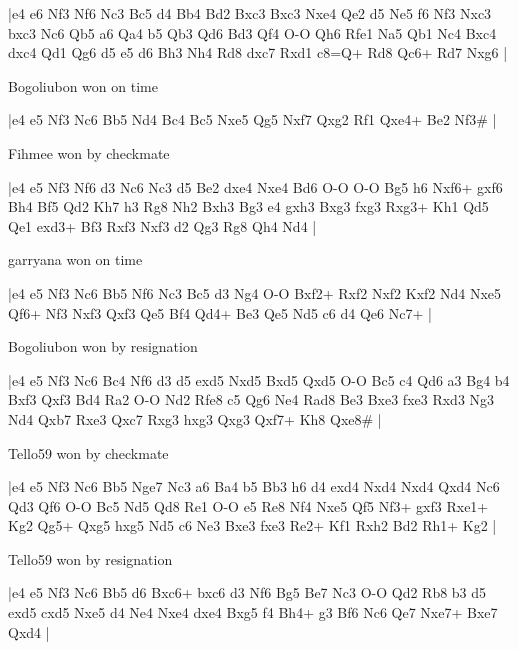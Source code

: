 \makegametitle
|e4 e6 Nf3 Nf6 Nc3 Bc5 d4 Bb4 Bd2 Bxc3 Bxc3 Nxe4 Qe2 d5 Ne5 f6 Nf3 Nxc3 bxc3 Nc6 Qb5 a6 Qa4 b5 Qb3 Qd6 Bd3 Qf4 O-O Qh6 Rfe1 Na5 Qb1 Nc4 Bxc4 dxc4 Qd1 Qg6 d5 e5 d6 Bh3 Nh4 Rd8 dxc7 Rxd1 c8=Q+ Rd8 Qc6+ Rd7 Nxg6  |

\showboard

Bogoliubon won on time

\makegametitle
|e4 e5 Nf3 Nc6 Bb5 Nd4 Bc4 Bc5 Nxe5 Qg5 Nxf7 Qxg2 Rf1 Qxe4+ Be2 Nf3\#  |

\showboard

Fihmee won by checkmate

\makegametitle
|e4 e5 Nf3 Nf6 d3 Nc6 Nc3 d5 Be2 dxe4 Nxe4 Bd6 O-O O-O Bg5 h6 Nxf6+ gxf6 Bh4 Bf5 Qd2 Kh7 h3 Rg8 Nh2 Bxh3 Bg3 e4 gxh3 Bxg3 fxg3 Rxg3+ Kh1 Qd5 Qe1 exd3+ Bf3 Rxf3 Nxf3 d2 Qg3 Rg8 Qh4 Nd4  |

\showboard

garryana won on time

\makegametitle
|e4 e5 Nf3 Nc6 Bb5 Nf6 Nc3 Bc5 d3 Ng4 O-O Bxf2+ Rxf2 Nxf2 Kxf2 Nd4 Nxe5 Qf6+ Nf3 Nxf3 Qxf3 Qe5 Bf4 Qd4+ Be3 Qe5 Nd5 c6 d4 Qe6 Nc7+  |

\showboard

Bogoliubon won by resignation

\makegametitle
|e4 e5 Nf3 Nc6 Bc4 Nf6 d3 d5 exd5 Nxd5 Bxd5 Qxd5 O-O Bc5 c4 Qd6 a3 Bg4 b4 Bxf3 Qxf3 Bd4 Ra2 O-O Nd2 Rfe8 c5 Qg6 Ne4 Rad8 Be3 Bxe3 fxe3 Rxd3 Ng3 Nd4 Qxb7 Rxe3 Qxc7 Rxg3 hxg3 Qxg3 Qxf7+ Kh8 Qxe8\#  |

\showboard

Tello59 won by checkmate

\makegametitle
|e4 e5 Nf3 Nc6 Bb5 Nge7 Nc3 a6 Ba4 b5 Bb3 h6 d4 exd4 Nxd4 Nxd4 Qxd4 Nc6 Qd3 Qf6 O-O Bc5 Nd5 Qd8 Re1 O-O e5 Re8 Nf4 Nxe5 Qf5 Nf3+ gxf3 Rxe1+ Kg2 Qg5+ Qxg5 hxg5 Nd5 c6 Ne3 Bxe3 fxe3 Re2+ Kf1 Rxh2 Bd2 Rh1+ Kg2  |

\showboard

Tello59 won by resignation

\makegametitle
|e4 e5 Nf3 Nc6 Bb5 d6 Bxc6+ bxc6 d3 Nf6 Bg5 Be7 Nc3 O-O Qd2 Rb8 b3 d5 exd5 cxd5 Nxe5 d4 Ne4 Nxe4 dxe4 Bxg5 f4 Bh4+ g3 Bf6 Nc6 Qe7 Nxe7+ Bxe7 Qxd4  |

